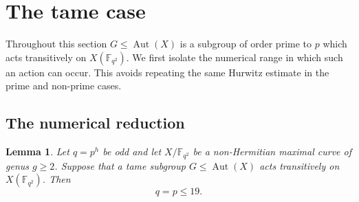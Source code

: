 \documentclass[11pt]{amsart}
\newtheorem{lemma}[theorem]{Lemma}
\theoremstyle{remark}
\newcommand{\F}{\mathbb F}
\newcommand{\Aut}{\operatorname{Aut}}
\begin{document}
\section{The tame case}\label{sec:tame}

Throughout this section $G\le\Aut(X)$ is a subgroup of order prime to
$p$ which acts transitively on $X(\F_{q^2})$.  We first isolate the
numerical range in which such an action can occur.  This avoids repeating
the same Hurwitz estimate in the prime and non-prime cases.

\subsection{The numerical reduction}

\begin{lemma}\label{lem:tamereduction}
Let $q=p^h$ be odd and let $X/\F_{q^2}$ be a non-Hermitian maximal
curve of genus $g\ge2$. Suppose that a tame subgroup
$G\le\Aut(X)$ acts transitively on $X(\F_{q^2})$. Then
\[
q=p\le19.
\]
\end{lemma}
\end{document}
